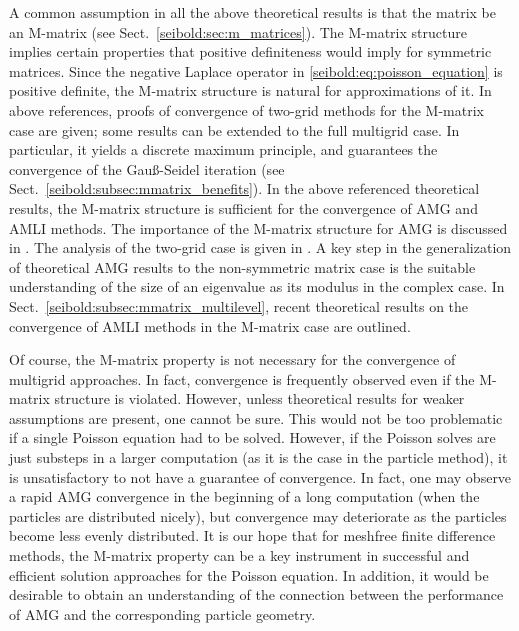 \documentclass[reqno]{amsart}
\theoremstyle{plain}
\theoremstyle{definition}
\theoremstyle{remark}
\begin{document}
A common assumption in all the above theoretical results is that the matrix be an
M-matrix (see Sect.~\ref{seibold:sec:m_matrices}). The M-matrix structure implies
certain properties that positive definiteness would imply for symmetric matrices.
Since the negative Laplace operator in \eqref{seibold:eq:poisson_equation} is
positive definite, the M-matrix structure is natural for approximations of it.
In above references, proofs of convergence of two-grid methods for the M-matrix case
are given; some results can be extended to the full multigrid case. In particular,
it yields a discrete maximum principle, and guarantees the convergence of the
Gau{\ss}-Seidel iteration (see Sect.~\ref{seibold:subsec:mmatrix_benefits}).
In the above referenced theoretical results, the M-matrix structure is sufficient
for the convergence of AMG and AMLI methods. The importance of the M-matrix
structure for AMG is discussed in \cite{Notay2000}. The analysis of the two-grid
case is given in \cite{Notay2009}. A key step in the generalization of theoretical
AMG results to the non-symmetric matrix case is the suitable understanding of the
size of an eigenvalue as its modulus in the complex case.
In Sect.~\ref{seibold:subsec:mmatrix_multilevel}, recent theoretical results on
the convergence of AMLI methods in the M-matrix case are outlined.

Of course, the M-matrix property is not necessary for the convergence of multigrid
approaches. In fact, convergence is frequently observed even if the M-matrix structure
is violated. However, unless theoretical results for weaker assumptions are present,
one cannot be sure.
This would not be too problematic if a single Poisson equation had to be
solved. However, if the Poisson solves are just substeps in a larger computation
(as it is the case in the particle method), it is unsatisfactory to not have a
guarantee of convergence. In fact, one may observe a rapid AMG convergence in the
beginning of a long computation (when the particles are distributed nicely), but
convergence may deteriorate as the particles become less evenly distributed.
It is our hope that for meshfree finite difference methods, the M-matrix property
can be a key instrument in successful and efficient solution approaches for the
Poisson equation. In addition, it would be desirable to obtain an understanding of
the connection between the performance of AMG and the corresponding particle geometry.
\end{document}
